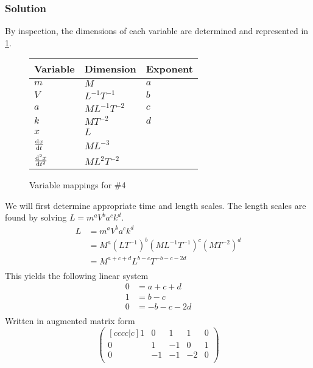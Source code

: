 \documentclass[12pt]{article}
\begin{document}
\subsubsection*{Solution}
By inspection, the dimensions of each variable are determined and represented in
\cref{fig:4-var-mappings}.
  \begin{figure}
    \centering
    \begin{tabularx}{0.5\textwidth}{XXX}
      Variable & Dimension & Exponent \\ \hline
      $m$ & $M$ & $a$ \\
      $V$ & $L^{-1}T^{-1}$ & $b$ \\
      $a$ & $ML^{-1}T^{-2}$ & $c$ \\
      $k$ & $MT^{-2}$ & $d$ \\
      $x$ & $L$ &  \\
      $\od{x}{t}$ & $ML^{-3}$ &  \\
      $\od[2]{x}{t}$ & $ML^{2}T^{-2}$ & \\
    \end{tabularx}
    \caption{Variable mappings for \#4}
    \label{fig:4-var-mappings}
  \end{figure}
We will first determine appropriate time and length scales. The length scales
are found by solving $L=m^aV^ba^ck^d$.
\begin{equation}
  \begin{aligned}
    L &= m^aV^ba^ck^d \\
    &= M^{a}(LT^{-1})^b(ML^{-1}T^{-1})^c(MT^{-2})^d \\
    &= M^{a+c+d}L^{b-c}T^{-b-c-2d} \\
  \end{aligned}
\end{equation}
This yields the following linear system
\begin{equation}
  \begin{aligned}
    0 &= a + c + d \\
    1 &= b - c \\
    0 &= -b  - c - 2d \\
  \end{aligned}
\end{equation}
Written in augmented matrix form
\begin{equation}
  \begin{pmatrix}[cccc|c]
    1 & 0 & 1 & 1 & 0 \\
    0 & 1 & -1 & 0 & 1 \\
    0 & -1 & -1 & -2 & 0 \\
  \end{pmatrix}
\end{equation}
\end{document}
